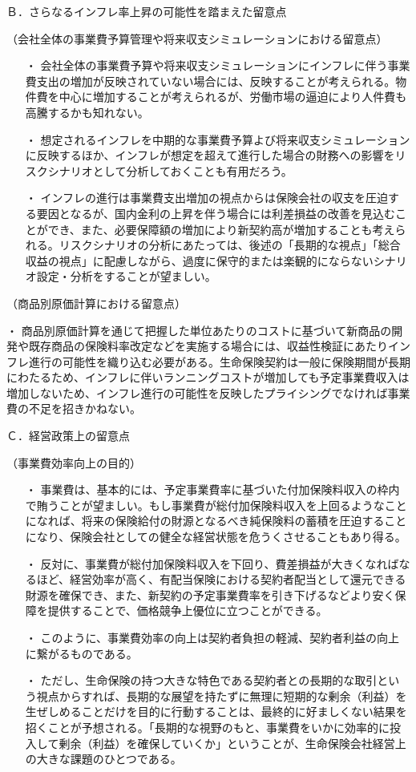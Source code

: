 \documentclass[report,gutter=10mm,fore-edge=10mm,uplatex,dvipdfmx]{jlreq}
\begin{document}
Ｂ．さらなるインフレ率上昇の可能性を踏まえた留意点

（会社全体の事業費予算管理や将来収支シミュレーションにおける留意点）

\begin{itemize}
 \item [・]  会社全体の事業費予算や将来収支シミュレーションにインフレに伴う事業費支出の増加が反映されていない場合には、反映することが考えられる。物件費を中心に増加することが考えられるが、労働市場の逼迫により人件費も高騰するかも知れない。
 \item [・]  想定されるインフレを中期的な事業費予算よび将来収支シミュレーションに反映するほか、インフレが想定を超えて進行した場合の財務への影響をリスクシナリオとして分析しておくことも有用だろう。
 \item [・]  インフレの進行は事業費支出増加の視点からは保険会社の収支を圧迫する要因となるが、国内金利の上昇を伴う場合には利差損益の改善を見込むことができ、また、必要保障額の増加により新契約高が増加することも考えられる。リスクシナリオの分析にあたっては、後述の「長期的な視点」「総合収益の視点」に配慮しながら、過度に保守的または楽観的にならないシナリオ設定・分析をすることが望ましい。
\end{itemize}

（商品別原価計算における留意点）

・ 商品別原価計算を通じて把握した単位あたりのコストに基づいて新商品の開発や既存商品の保険料率改定などを実施する場合には、収益性検証にあたりインフレ進行の可能性を織り込む必要がある。生命保険契約は一般に保険期間が長期にわたるため、インフレに伴いランニングコストが増加しても予定事業費収入は増加しないため、インフレ進行の可能性を反映したプライシングでなければ事業費の不足を招きかねない。

Ｃ．経営政策上の留意点

（事業費効率向上の目的）

\begin{itemize}
 \item [・]  事業費は、基本的には、予定事業費率に基づいた付加保険料収入の枠内で賄うことが望ましい。もし事業費が総付加保険料収入を上回るようなことになれば、将来の保険給付の財源となるべき純保険料の蓄積を圧迫することになり、保険会社としての健全な経営状態を危うくさせることもあり得る。
 \item [・]  反対に、事業費が総付加保険料収入を下回り、費差損益が大きくなればなるほど、経営効率が高く、有配当保険における契約者配当として還元できる財源を確保でき、また、新契約の予定事業費率を引き下げるなどより安く保障を提供することで、価格競争上優位に立つことができる。
 \item [・]  このように、事業費効率の向上は契約者負担の軽減、契約者利益の向上に繋がるものである。
 \item [・]  ただし、生命保険の持つ大きな特色である契約者との長期的な取引という視点からすれば、長期的な展望を持たずに無理に短期的な剰余（利益）を生ぜしめることだけを目的に行動することは、最終的に好ましくない結果を招くことが予想される。「長期的な視野のもと、事業費をいかに効率的に投入して剰余（利益）を確保していくか」ということが、生命保険会社経営上の大きな課題のひとつである。
\end{itemize}
\end{document}
